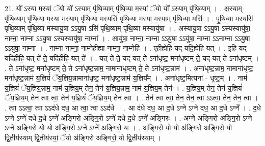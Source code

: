 \documentclass[17pt]{extarticle}
\begin{document}
21. यो᳚ ऽस्या म॒स्यां ॅयो यो᳚ ऽस्याम् पृ॑थि॒व्याम् पृ॑थि॒व्या म॒स्यां ॅयो यो᳚ ऽस्याम् पृ॑थि॒व्याम् । . अ॒स्याम् पृ॑थि॒व्याम् पृ॑थि॒व्या म॒स्या म॒स्याम् पृ॑थि॒व्या मस्यसि॑ पृथि॒व्या म॒स्या म॒स्याम् पृ॑थि॒व्या मसि॑ । . पृ॒थि॒व्या मस्यसि॑ पृथि॒व्याम् पृ॑थि॒व्या मस्यायु॒षा ऽऽयु॒षा ऽसि॑ पृथि॒व्याम् पृ॑थि॒व्या मस्यायु॑षा । . अस्यायु॒षा ऽऽयु॒षा ऽस्यस्यायु॑षा॒ नाम्ना॒ नाम्ना ऽऽयु॒षा ऽस्यस्यायु॑षा॒ नाम्ना᳚ । . आयु॑षा॒ नाम्ना॒ नाम्ना ऽऽयु॒षा ऽऽयु॑षा॒ नाम्ना ऽऽनाम्ना ऽऽयु॒षा ऽऽयु॑षा॒ नाम्ना । . नाम्ना नाम्ना॒ नाम्नेही॒ह्या नाम्ना॒ नाम्नेहि॑ । . एही॒ह्येहि॒ यद् यदि॒ह्येहि॒ यत् । . इ॒हि॒ यद् यदि॑हीहि॒ यत् ते॑ ते॒ यदि॑हीहि॒ यत् ते᳚ । . यत् ते॑ ते॒ यद् यत् ते ऽना॑धृष्ट॒ मना॑धृष्टम् ते॒ यद् यत् ते ऽना॑धृष्टम् । . ते ऽना॑धृष्ट॒ मना॑धृष्टम् ते॒ ते ऽना॑धृष्ट॒न्नाम॒ नामाना॑धृष्टम् ते॒ ते ऽना॑धृष्ट॒न्नाम॑ । . अना॑धृष्ट॒न्नाम॒ नामाना॑धृष्ट॒ मना॑धृष्ट॒न्नाम॑ य॒ज्ञियं॑ ॅय॒ज्ञिय॒न्नामाना॑धृष्ट॒ मना॑धृष्ट॒न्नाम॑ य॒ज्ञिय᳚म् । . अना॑धृष्ट॒मित्यना᳚ - धृ॒ष्ट॒म् । . नाम॑ य॒ज्ञियं॑ ॅय॒ज्ञिय॒न्नाम॒ नाम॑ य॒ज्ञिय॒म् तेन॒ तेन॑ य॒ज्ञिय॒न्नाम॒ नाम॑ य॒ज्ञिय॒म् तेन॑ । . य॒ज्ञिय॒म् तेन॒ तेन॑ य॒ज्ञियं॑ ॅय॒ज्ञिय॒म् तेन॑ त्वा त्वा॒ तेन॑ य॒ज्ञियं॑ ॅय॒ज्ञिय॒म् तेन॑ त्वा । . तेन॑ त्वा त्वा॒ तेन॒ तेन॒ त्वा ऽऽत्वा॒ तेन॒ तेन॒ त्वा । . त्वा ऽऽत्वा॒ त्वा ऽऽद॑धे दध॒ आ त्वा॒ त्वा ऽऽद॑धे । . आ द॑धे दध॒ आ द॒धे ऽग्ने ऽग्ने॑ दध॒ आ द॒धे ऽग्ने᳚ । . द॒धे ऽग्ने ऽग्ने॑ दधे द॒धे ऽग्ने॑ अङ्गिरो अङ्गि॒रो ऽग्ने॑ दधे द॒धे ऽग्ने॑ अङ्गिरः । . अग्ने॑ अङ्गिरो अङ्गि॒रो ऽग्ने ऽग्ने॑ अङ्गिरो॒ यो यो अ॑ङ्गि॒रो ऽग्ने ऽग्ने॑ अङ्गिरो॒ यः । . अ॒ङ्गि॒रो॒ यो यो अ॑ङ्गिरो अङ्गिरो॒ यो द्वि॒तीय॑स्याम् द्वि॒तीय॑स्यां॒ ॅयो अ॑ङ्गिरो अङ्गिरो॒ यो द्वि॒तीय॑स्याम् । \newline
\end{document}
